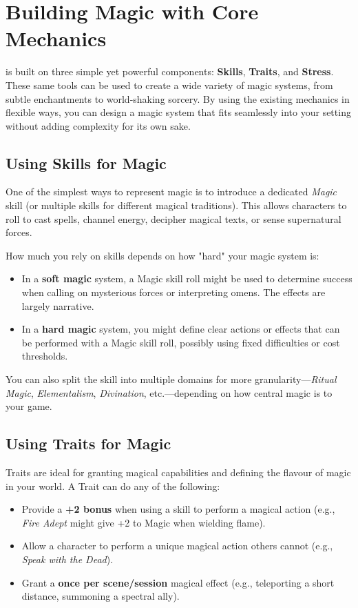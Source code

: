 
\section{Building Magic with Core Mechanics}

\wyrd is built on three simple yet powerful components: \textbf{Skills}, \textbf{Traits}, and \textbf{Stress}. These same tools can be used to create a wide variety of magic systems, from subtle enchantments to world-shaking sorcery. By using the existing mechanics in flexible ways, you can design a magic system that fits seamlessly into your setting without adding complexity for its own sake.

\subsection*{Using Skills for Magic}

One of the simplest ways to represent magic is to introduce a dedicated \textit{Magic} skill (or multiple skills for different magical traditions). This allows characters to roll to cast spells, channel energy, decipher magical texts, or sense supernatural forces.

How much you rely on skills depends on how "hard" your magic system is:
\begin{itemize}
    \item In a \textbf{soft magic} system, a Magic skill roll might be used to determine success when calling on mysterious forces or interpreting omens. The effects are largely narrative.
    \item In a \textbf{hard magic} system, you might define clear actions or effects that can be performed with a Magic skill roll, possibly using fixed difficulties or cost thresholds.
\end{itemize}

You can also split the skill into multiple domains for more granularity—\textit{Ritual Magic}, \textit{Elementalism}, \textit{Divination}, etc.—depending on how central magic is to your game.

\subsection*{Using Traits for Magic}

Traits are ideal for granting magical capabilities and defining the flavour of magic in your world. A Trait can do any of the following:
\begin{itemize}
    \item Provide a \textbf{+2 bonus} when using a skill to perform a magical action (e.g., \textit{Fire Adept} might give +2 to Magic when wielding flame).
    \item Allow a character to perform a unique magical action others cannot (e.g., \textit{Speak with the Dead}).
    \item Grant a \textbf{once per scene/session} magical effect (e.g., teleporting a short distance, summoning a spectral ally).
\end{itemize}

